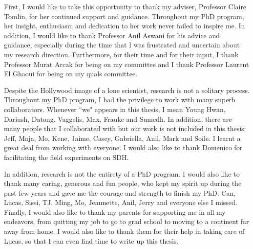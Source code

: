 \documentclass[12pt, oneside, final]{lib/ucthesis}
\begin{document}
\tableofcontents

\begin{acknowledgements}
\thispagestyle{plain}

First, I would like to take this opportunity to thank my adviser, Professor Claire Tomlin, for her continued support and guidance. Throughout my PhD program, her insight, enthusiasm and dedication to her work never failed to inspire me.
In addition, I would like to thank Professor Anil Aswani for his advice and guidance, especially during the time that I was frustrated and uncertain about my research direction.
Furthermore, for their time and for their input, I thank Professor Murat Arcak for being on my committee and I thank Professor Laurent El Ghaoui for being on my quals committee.

Despite the Hollywood image of a lone scientist, research is not a solitary process. 
Throughout my PhD program, I had the privilege to work with many superb collaborators. Whenever ``we" appears in this thesis, I mean Young Hwan, Dariush, Datong, Vaggelis, Max, Frauke and Sumedh. 
In addition, there are many people that I collaborated with but our work is not included in this thesis: Jeff, Maja, Mo, Kene, Jaime, Casey, Gabriella, Anil, Mark and Soile. 
I learnt a great deal from working with everyone.
I would also like to thank Domenico for facilitating the field experiments on SDH.

In addition, research is not the entirety of a PhD program. I would also like to thank many caring, generous and fun people, who kept my spirit up during the past few years and gave me the courage and strength to finish my PhD: Can, Lucas, Sissi, TJ, Ming, Mo, Jeannette, Anil, Jerry and everyone else I missed.
Finally, I would also like to thank my parents for supporting me in all my endeavors, from quitting my job to go to grad school to moving to a continent far away from home. I would also like to thank them for their help in taking care of Lucas, so that I can even find time to write up this thesis.


\end{acknowledgements}



\end{document}
